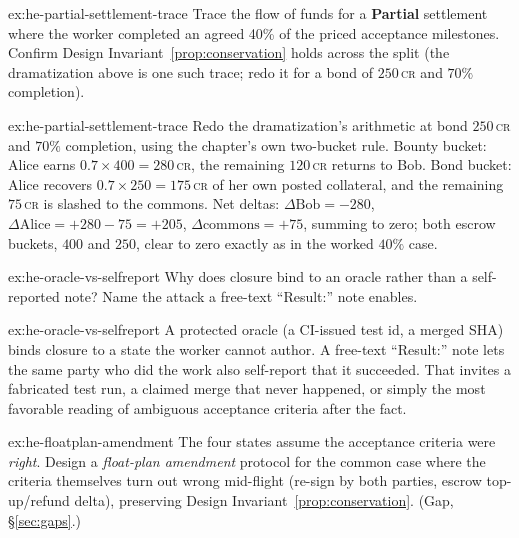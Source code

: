 \documentclass[11pt,a4paper]{article}
\theoremstyle{definition}
\theoremstyle{definition}
\theoremstyle{remark}
\begin{document}

\begin{pdexercise}[kind=Trace,rating=2]{ex:he-partial-settlement-trace}
Trace the flow of funds for a \textbf{Partial} settlement where the worker
  completed an agreed 40\% of the priced acceptance milestones. Confirm Design Invariant~\ref{prop:conservation}
  holds across the split (the dramatization above is one such trace; redo it for a
  bond of $250$\,\textsc{cr} and $70\%$ completion).
\end{pdexercise}
\begin{pdsolution}{ex:he-partial-settlement-trace}
Redo the dramatization's arithmetic at bond $250$\,\textsc{cr} and $70\%$
completion, using the chapter's own two-bucket rule. Bounty bucket: Alice earns
$0.7\times400=280$\,\textsc{cr}, the remaining $120$\,\textsc{cr} returns to Bob.
Bond bucket: Alice recovers $0.7\times250=175$\,\textsc{cr} of her own posted
collateral, and the remaining $75$\,\textsc{cr} is slashed to the commons. Net
deltas: $\Delta\text{Bob}=-280$, $\Delta\text{Alice}=+280-75=+205$,
$\Delta\text{commons}=+75$, summing to zero; both escrow buckets, $400$ and
$250$, clear to zero exactly as in the worked $40\%$ case.
\end{pdsolution}
\begin{pdexercise}[kind=Check,rating=1]{ex:he-oracle-vs-selfreport}
Why does closure bind to an oracle rather than a self-reported note? Name the
  attack a free-text ``Result:'' note enables.
\end{pdexercise}
\begin{pdsolution}{ex:he-oracle-vs-selfreport}
A protected oracle (a CI-issued test id, a merged SHA) binds closure to a
state the worker cannot author. A free-text ``Result:'' note lets the same party
who did the work also self-report that it succeeded. That invites a fabricated
test run, a claimed merge that never happened, or simply the most favorable
reading of ambiguous acceptance criteria after the fact.
\end{pdsolution}
\begin{pdexercise}[kind=Open,rating=3]{ex:he-floatplan-amendment}
The four states assume the acceptance criteria were \emph{right}.
  Design a \emph{float-plan amendment} protocol for the common case where the
  criteria themselves turn out wrong mid-flight (re-sign by both parties, escrow
  top-up/refund delta), preserving Design Invariant~\ref{prop:conservation}. (Gap, \S\ref{sec:gaps}.)
\end{pdexercise}
\end{document}
